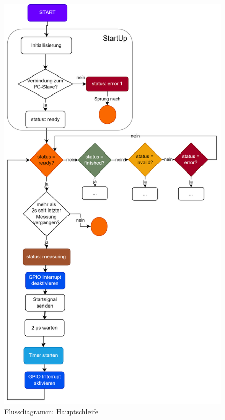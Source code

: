 \documentclass[11pt,a4paper,titlepage]{article}
\begin{document}
\begin{figure}[H]
    \centering
    \includegraphics[height=0.9\textheight]{./Bilder-Tobit/flussdiagramm_main.png}
    \caption{Flussdiagramm: Hauptschleife}
    \label{fig:flussdiagramm_main}
\end{figure}
\end{document}
